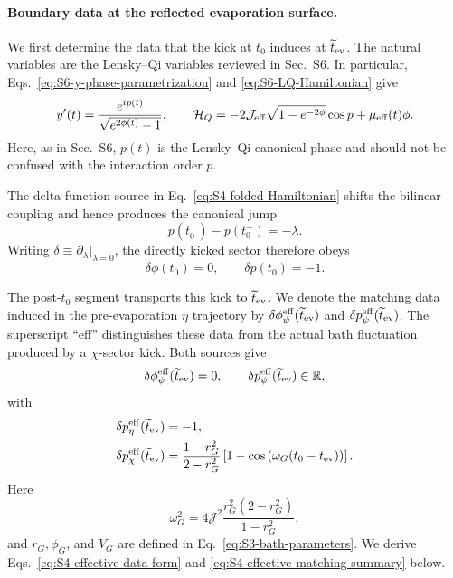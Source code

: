 \documentclass[11pt,a4paper]{article}
\begin{document}
\paragraph*{Boundary data at the reflected evaporation surface.}

We first determine the data that the kick at \(t_0\) induces at
\(\widetilde t_{\rm ev}\). The natural variables are the Lensky--Qi variables
reviewed in Sec.~S6. In particular, Eqs.~\eqref{eq:S6-y-phase-parametrization}
and \eqref{eq:S6-LQ-Hamiltonian} give
\begin{equation}
  y'(t)
  =
  \frac{e^{ip(t)}}{\sqrt{e^{2\phi(t)}-1}},
  \qquad
  \mathcal H_Q
  =
  -2\mathcal J_{\rm eff}
  \sqrt{1-e^{-2\phi}}\cos p
  +
  \mu_{\rm eff}(t)\phi .
\label{eq:S4-LQ-reminder}
\end{equation}
Here, as in Sec.~S6, \(p(t)\) is the Lensky--Qi canonical phase and should not
be confused with the interaction order \(p\).

The delta-function source in Eq.~\eqref{eq:S4-folded-Hamiltonian} shifts the
bilinear coupling and hence produces the canonical jump
\begin{equation}
  p(t_0^+)-p(t_0^-)
  =
  -\lambda .
\label{eq:S4-canonical-kick}
\end{equation}
Writing \(\delta\equiv\partial_\lambda|_{\lambda=0}\), the directly kicked
sector therefore obeys
\begin{equation}
  \delta\phi(t_0)=0,
  \qquad
  \delta p(t_0)=-1.
\label{eq:S4-local-kick-data}
\end{equation}

The post-\(t_0\) segment transports this kick to
\(\widetilde t_{\rm ev}\). We denote the matching data induced in the
pre-evaporation \(\eta\) trajectory by
\(\delta\phi_\psi^{\rm eff}(\widetilde t_{\rm ev})\) and
\(\delta p_\psi^{\rm eff}(\widetilde t_{\rm ev})\). The superscript
``eff'' distinguishes these data from the actual bath fluctuation produced
by a \(\chi\)-sector kick. Both sources give
\begin{equation}
  \delta\phi_\psi^{\rm eff}(\widetilde t_{\rm ev})=0,
  \qquad
  \delta p_\psi^{\rm eff}(\widetilde t_{\rm ev})\in\mathbb R,
\label{eq:S4-effective-data-form}
\end{equation}
with
\begin{equation}
\begin{aligned}
  \delta p_\eta^{\rm eff}(\widetilde t_{\rm ev})
  &=
  -1,
  \\
  \delta p_\chi^{\rm eff}(\widetilde t_{\rm ev})
  &=
  \frac{1-r_G^2}{2-r_G^2}
  \left[
  1-
  \cos\left(
  \omega_G(t_0-t_{\rm ev})
  \right)
  \right].
\end{aligned}
\label{eq:S4-effective-matching-summary}
\end{equation}
Here
\begin{equation}
  \omega_G^2
  =
  4\mathcal J^2
  \frac{r_G^2(2-r_G^2)}{1-r_G^2},
\label{eq:S4-bath-frequency}
\end{equation}
and \(r_G,\phi_G\), and \(V_G\) are defined in
Eq.~\eqref{eq:S3-bath-parameters}. We derive
Eqs.~\eqref{eq:S4-effective-data-form} and
\eqref{eq:S4-effective-matching-summary} below.
\end{document}
